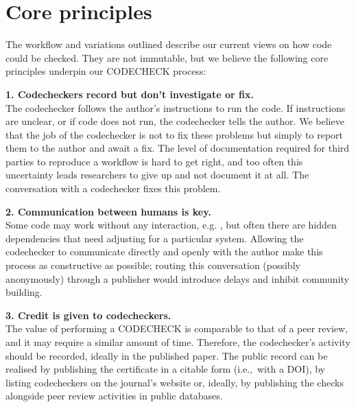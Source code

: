 \documentclass[12pt]{article}
\begin{document}
\section*{Core principles}\label{core-principles}

The workflow and variations outlined describe our current
views on how code could be checked.  They are not immutable, but
we believe the following core principles underpin our CODECHECK
process:

\textbf{1. Codecheckers record but don't investigate or fix.} \\
The codechecker follows the author's instructions to run the code. If
instructions are unclear, or if code does not run, the codechecker
tells the author. We believe that the job of the codechecker is not to
fix these problems but simply to report them to the author and await a
fix.  The level of documentation required for third parties to
reproduce a workflow is hard to get right, and too often this
uncertainty leads researchers to give up and not document it at all.
The conversation with a codechecker fixes this problem.

\textbf{2. Communication between humans is key.} \\
Some code may work without any interaction, e.g. \cite{cert-2020-013},
but often there are hidden dependencies that need adjusting for a
particular system.  Allowing the codechecker to communicate directly
and openly with the author make this process as constructive as
possible; routing this conversation (possibly anonymously) through a
publisher would introduce delays and inhibit community building.

\textbf{3. Credit is given to codecheckers.} \\
The value of performing a CODECHECK is comparable to that of a peer
review, and it may require a similar amount of time. Therefore, the
codechecker's activity should be recorded, ideally in the published
paper.  The public record can be realised by publishing the
certificate in a citable form (i.e.,~with a DOI), by
listing codecheckers on the journal's website or, ideally, by
publishing the checks alongside peer review activities in public
databases.
\end{document}
